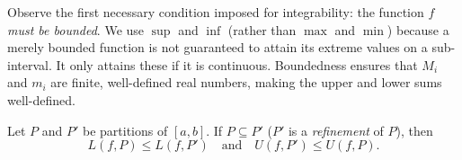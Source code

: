 \documentclass[../analysis1.tex]{subfiles}
\begin{document}
\begin{remark}
    Observe the first necessary condition imposed for integrability: the function $f$ \textit{must be bounded}. We use $\sup$ and $\inf$ (rather than $\max$ and $\min$) because a merely bounded function is not guaranteed to attain its extreme values on a sub-interval. It only attains these if it is continuous. Boundedness ensures that $M_i$ and $m_i$ are finite, well-defined real numbers, making the upper and lower sums well-defined.
\end{remark}


\begin{lemma}
\label{lem:refinement}
    \begin{shaded*}
        Let $P$ and $P'$ be partitions of $[a,b]$. If $P \subseteq P'$ ($P'$ is a \textit{refinement} of $P$), then
        \[
            L(f,P) \le L(f, P')\quad\text{and}\quad  U(f, P') \le U(f,P).
        \]
    \end{shaded*}
\end{lemma}
\end{document}
